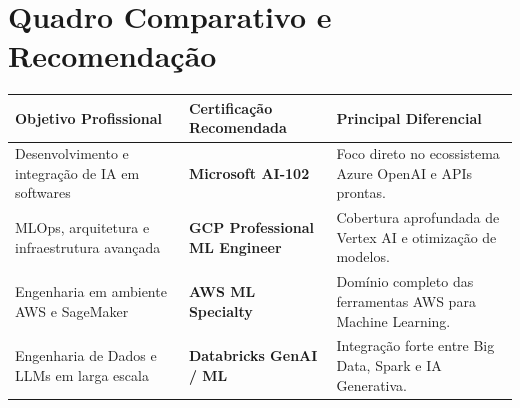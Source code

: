\documentclass[11pt, a4paper]{article}
\begin{document}
\vspace{1.5em}

\section*{\color{primary}Quadro Comparativo e Recomendação}

\begin{table}[h]
\centering
\small
\begin{tabular}{p{4.5cm} p{4cm} p{5.5cm}}
\toprule
\textbf{Objetivo Profissional} & \textbf{Certificação Recomendada} & \textbf{Principal Diferencial} \\
\midrule
Desenvolvimento e integração de IA em softwares & \textbf{Microsoft AI-102} & Foco direto no ecossistema Azure OpenAI e APIs prontas. \\
\addlinespace
MLOps, arquitetura e infraestrutura avançada & \textbf{GCP Professional ML Engineer} & Cobertura aprofundada de Vertex AI e otimização de modelos. \\
\addlinespace
Engenharia em ambiente AWS e SageMaker & \textbf{AWS ML Specialty} & Domínio completo das ferramentas AWS para Machine Learning. \\

\addlinespace
Engenharia de Dados e LLMs em larga escala & \textbf{Databricks GenAI / ML} & Integração forte entre Big Data, Spark e IA Generativa. \\
\bottomrule
\end{tabular}
\end{table}
\end{document}
